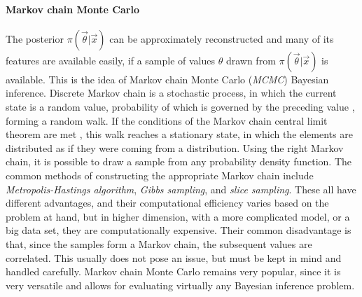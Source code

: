 \paragraph{Markov chain Monte Carlo}
The posterior $\pi(\vec{\theta}|\vec{x})$ can be approximately reconstructed and many of its features are available easily, if a sample of values $\theta$ drawn from $\pi(\vec{\theta}|\vec{x})$ is available. This is the idea of Markov chain Monte Carlo (\textit{MCMC}) Bayesian inference. Discrete Markov chain is a stochastic process, in which the current state is a random value, probability of which is governed by the preceding value \citep{markov1906extension}, forming a random walk. If the conditions of the Markov chain central limit theorem are met \citep{jones2004markov}, this walk reaches a stationary state, in which the elements are distributed as if they were coming from a distribution. Using the right Markov chain, it is possible to draw a sample from any probability density function. The common methods of constructing the appropriate Markov chain include \textit{Metropolis-Hastings algorithm}, \textit{Gibbs sampling}, and \textit{slice sampling}. These all have different advantages, and their computational efficiency varies based on the problem at hand, but in higher dimension, with a more complicated model, or a big data set, they are computationally expensive. Their common disadvantage is that, since the samples form a Markov chain, the subsequent values are correlated. This usually does not pose an issue, but must be kept in mind and handled carefully. Markov chain Monte Carlo remains very popular, since it is very versatile and allows for evaluating virtually any Bayesian inference problem.

